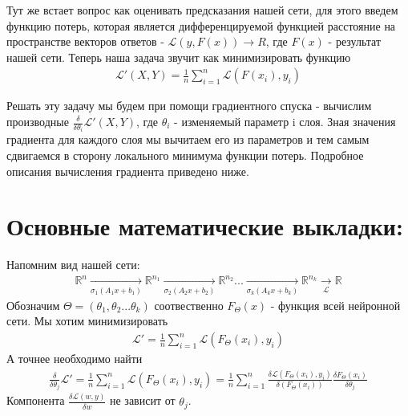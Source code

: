 \documentclass{article}
\newcommand{\R}{\mathbb{R}}
\newcommand{\Li}{\mathscr{L}}
\begin{document}
Тут же встает вопрос как оценивать предсказания нашей сети, для этого введем функцию потерь, 
которая является дифференцируемой функцией расстояние на пространстве векторов ответов - $\Li(y, F(x)) \to R$, где $F(x)$ - результат нашей сети.
Теперь наша задача звучит как минимизировать функцию
\begin{align}
    \Li'(X, Y) = \frac{1}{n}\sum_{i=1}^{n} \Li(F(x_i), y_i)
\end{align}

Решать эту задачу мы будем при помощи градиентного спуска - вычислим производные $\frac{\delta}{\delta \theta_i} \Li'(X, Y)$,
где $\theta_i$ - изменяемый параметр i слоя. Зная значения градиента для каждого слоя мы вычитаем его из параметров и тем самым 
сдвигаемся в сторону локального минимума функции потерь. Подробное описания вычисления градиента приведено ниже.
\section{Основные математические выкладки:}
Напомним вид нашей сети:
\begin{align}
    \R^n \underset{\sigma_1(A_1 x + b_1)}{\longrightarrow} \R^{n_1} 
    \underset{\sigma_2(A_2 x + b_2)}{\longrightarrow} \R^{n_2} ... 
    \underset{\sigma_k(A_k x + b_k)}{\longrightarrow} \R^{n_k}
    \underset{\Li}{\longrightarrow} \R
\end{align}
Обозначим $\Theta = (\theta_1, \theta_2 ...\theta_k)$ соотвественно
$F_{\Theta}(x)$ - функция всей нейронной сети. Мы хотим минимизировать
\begin{align}
    \Li' = \frac{1}{n} \sum_{i=1}^{n} \Li(F_{\Theta}(x_i), y_i)
\end{align}
А точнее необходимо найти 
\begin{align}
    \frac{\delta}{\delta \theta_j}\Li' = \frac{1}{n} \sum_{i=1}^{n} \Li(F_{\Theta}(x_i), y_i) = 
    \frac{1}{n}  \sum_{i=1}^{n} \frac{\delta \Li(F_{\Theta}(x_i), y_i)}{\delta(F_{\Theta}(x_i))} \frac{\delta F_{\Theta}(x_i)}{\delta \theta_j}
\end{align}
Компонента $\frac{\delta \Li(w, y)}{\delta w}$ не зависит от $\theta_j$.
\end{document}
